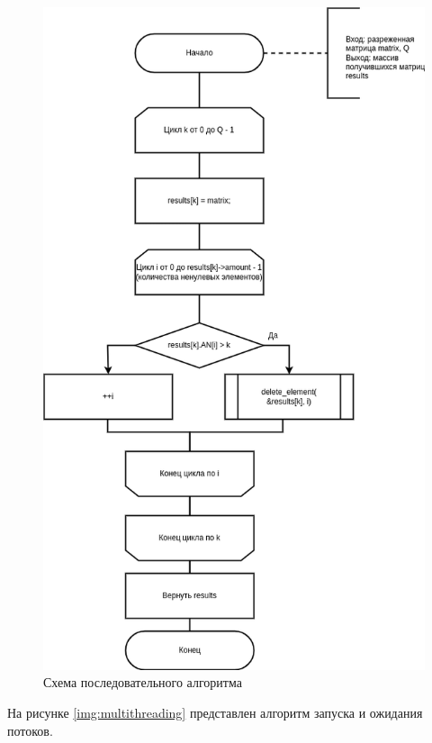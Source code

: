 \begin{figure}[H]
	\begin{center}
		\includegraphics[scale=0.6]{img/sequential.png}
	\end{center}
	\captionsetup{justification=centering}
	\caption{Схема последовательного алгоритма}
	\label{img:sequential}
\end{figure}

На рисунке \ref{img:multithreading} представлен алгоритм запуска и ожидания потоков.

